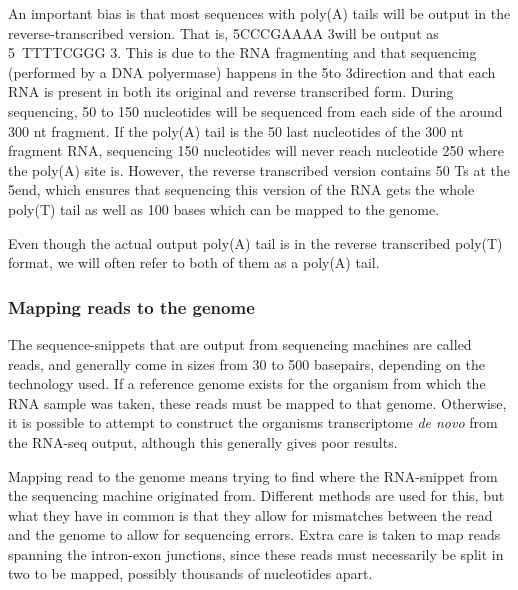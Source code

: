 An important bias is that most sequences with poly(A) tails will be output in
the reverse-transcribed version. That is, 5\p CCCGAAAA 3\p will be output as 5\
TTTTCGGG 3\p. This is due to the RNA fragmenting and that sequencing
(performed by a DNA polyermase) happens in the 5\p to 3\p direction and that
each RNA is present in both its original and reverse transcribed form. During
sequencing, 50 to 150 nucleotides will be sequenced from each side of the around
300 nt fragment. If the poly(A) tail is the 50 last nucleotides of the 300 nt
fragment RNA, sequencing 150 nucleotides will never reach nucleotide 250 where
the poly(A) site is. However, the reverse transcribed version contains 50 Ts at
the 5\p end, which ensures that sequencing this version of the RNA gets the
whole poly(T) tail as well as 100 bases which can be mapped to the genome.

Even though the actual output poly(A) tail is in the reverse transcribed
poly(T) format, we will often refer to both of them as a poly(A) tail.

\subsubsection{Mapping reads to the genome}
The sequence-snippets that are output from sequencing machines are called
reads, and generally come in sizes from 30 to 500 basepairs, depending on the
technology used. If a reference genome exists for the organism from which the
RNA sample was taken, these reads must be mapped to that genome. Otherwise, it
is possible to attempt to construct the organisms transcriptome \textit{de
novo} from the RNA-seq output, although this generally gives poor results.

Mapping read to the genome means trying to find where the RNA-snippet from the
sequencing machine originated from. Different methods are used for this, but
what they have in common is that they allow for mismatches between the read and
the genome to allow for sequencing errors. Extra care is taken to map reads
spanning the intron-exon junctions, since these reads must necessarily be split
in two to be mapped, possibly thousands of nucleotides apart.
